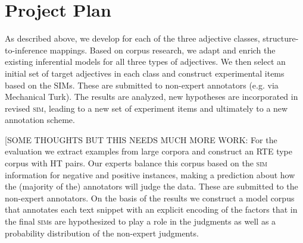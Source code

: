 \documentclass[10pt]{article}
\begin{document}


\vspace {-7mm}

\section{Project Plan}

\vspace {-3mm}

As described above, we develop for each of the three adjective classes, structure-to-inference mappings. Based on corpus research, we adapt and enrich the existing inferential models for all three types of adjectives. We then select an initial set of target adjectives in each class and construct experimental items based on the SIMs. These are submitted to non-expert annotators (e.g. via Mechanical Turk). The results are analyzed, new hypotheses are incorporated in revised \textsc{sim}, leading to a new set of experiment items and ultimately to a new annotation scheme. 

[SOME THOUGHTS BUT THIS NEEDS MUCH MORE WORK: For the evaluation we extract examples from large corpora and construct an RTE type corpus with HT pairs. Our experts balance this corpus based on the \textsc{sim} information for negative and positive instances, making a prediction about how the (majority of the) annotators will judge the data. These are submitted to the non-expert annotators. On the basis of the results we construct a model corpus that annotates each text snippet with an explicit encoding of the factors that in the final \textsc{sim}s are hypothesized to play a role in the judgments as well as a probability distribution of the non-expert judgments.  
\end{document}
